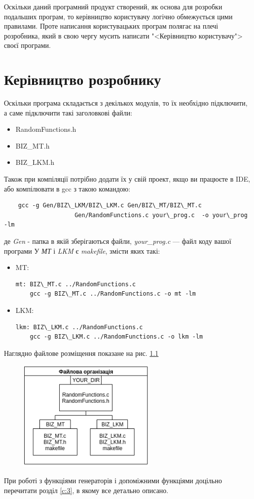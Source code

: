 \documentclass[oneside,final,14pt]{extreport}
\begin{document}
\begin{large}
Оскільки даний програмний продукт створений, як основа для розробки подальших програм,
то керівництво користувачу логічно обмежується цими правилами. Проте написання користувацьких 
програм полягає на плечі розробника, який в свою чергу мусить написати "<Керівництво користувачу"> 
своєї програми.
\chapter{Керівництво розробнику}\label{c:5}
	Оскільки програма складається з декількох модулів, то їх необхідно підключити, 
	а саме підключити такі заголовкові файли:
	\begin{itemize}
\item RandomFunctions.h
\item BIZ\_MT.h
\item BIZ\_LKM.h
	\end{itemize}
Також при компіляції потрібно додати їх у свій проект, якщо ви працюєте в IDE, або компілювати в gcc з такою командою: 
\begin{verbatim}
	gcc -g Gen/BIZ\_LKM/BIZ\_LKM.c Gen/BIZ\_MT/BIZ\_MT.c 
					Gen/RandomFunctions.c your\_prog.c  -o your\_prog -lm	
\end{verbatim}

де {\itshape Gen} - папка в якій зберігаються файли, {\itshape your\_prog.c} --- файл коду вашої програми
У {\itshape МТ} і {\itshape LKM} є {\itshape makefile}, змісти яких такі:
\begin{itemize}
	\item
MT:\\
\begin{verbatim}
mt: BIZ\_MT.c ../RandomFunctions.c
	gcc -g BIZ\_MT.c ../RandomFunctions.c -o mt -lm	
\end{verbatim}

	\item
LKM:\\	
\begin{verbatim}
lkm: BIZ\_LKM.c ../RandomFunctions.c
	gcc -g BIZ\_LKM.c ../RandomFunctions.c -o lkm -lm	
\end{verbatim}
\end{itemize}
Наглядно файлове розміщення показане на рис. \ref{p:51}
\begin{figure}[H]
	\centering
	\includegraphics[width=0.6\textwidth]{proc.png}
	\caption{}
	\label{p:51}
\end{figure}
При роботі з функціями генераторів і допоміжними функціями доцільно перечитати розділ \ref{c:3}, 
в якому все детально описано. 

\end{large}
\end{document}
